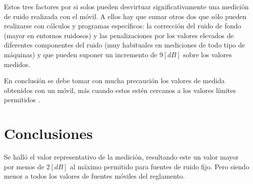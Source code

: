 \documentclass[letter,11pt]{article}
\begin{document}
Estos tres factores por si solos pueden desvirtuar significativamente una
medición de ruido realizada con el móvil. A ellos hay que sumar otros dos que
sólo pueden realizarse con cálculos y programas específicos: la corrección del
ruido de fondo (mayor en entornos ruidosos) y las penalizaciones por los valores
elevados de diferentes componentes del ruido (muy habituales en mediciones de
todo tipo de máquinas) y que pueden suponer un incremento de $9 [dB]$ sobre los
valores medidos.

En conclusión se debe tomar con mucha precaución los valores de medida obtenidos
con un móvil, más cuando estos estén cercanos a los valores límites permitidos
\cite{ALLPE}.

\section{Conclusiones}

Se halló el valor representativo de la medición, resultando este un valor mayor
por menos de $2 [dB]$ al máximo permitido para fuentes de ruido fijo. Pero
siendo menor a todos los valores de fuentes móviles del reglamento.
\end{document}
